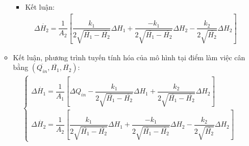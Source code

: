 \begin{enumerate}[\it a.]
\begin{itemize}
\begin{itemize}
                            \item Kết luận:
                                \begin{align}
                                    \Delta \dot{H_2} = \dfrac{1}{A_2} \left[{\dfrac{k_1}{2 \sqrt{\overline{H_1} - \overline{H_2}}} \Delta H_1 + \dfrac{-k_1}{2 \sqrt{\overline{H_1} - \overline{H_2}}} \Delta H_2 - \dfrac{k_2}{2 \sqrt{\overline{H_2}}} \Delta H_2}\right]
                                \end{align}
                        \end{itemize}

                    \item Kết luận, phương trình tuyến tính hóa của mô hình tại điểm làm việc cân bằng $\left({\overline{Q_{in}}, \overline{H_1}, \overline{H_2}}\right)$:
                        \begin{align}
                            \left\{
                            \begin{array}{l}
                                \Delta \dot{H_1} = \dfrac{1}{A_1} \left[{\Delta Q_{in} - \dfrac{k_1}{2\sqrt{\overline{H_1} - \overline{H_2}}} \Delta H_1 + \dfrac{k_2}{2\sqrt{\overline{H_1} - \overline{H_2}}} \Delta H_2}\right]\\ [.5cm]
                                \Delta \dot{H_2} = \dfrac{1}{A_2} \left[{\dfrac{k_1}{2 \sqrt{\overline{H_1} - \overline{H_2}}} \Delta H_1 + \dfrac{-k_1}{2 \sqrt{\overline{H_1} - \overline{H_2}}} \Delta H_2 - \dfrac{k_2}{2 \sqrt{\overline{H_2}}} \Delta H_2}\right]
                            \end{array}
                            \right.
                        \end{align}
                \end{itemize}


\end{enumerate}

